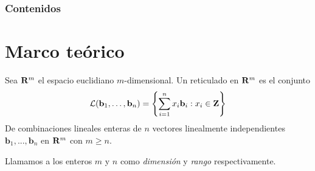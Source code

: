 


\frame{\titlepage}

\begin{frame}
\frametitle{Contenidos}
\tableofcontents
\end{frame}

\section{Marco teórico}


\begin{frame}
\begin{definition}[Reticulado]
Sea $\mathbf{R}^m$ el espacio euclidiano $m$-dimensional. Un reticulado en $\mathbf{R}^m$ es el conjunto
\[
\mathcal L(\mathbf{b}_1, \dots, \mathbf{b}_n) = \left\{\sum_{i = 1}^n x_i \mathbf{b}_i : x_i  \in \mathbf{Z}\right\}
\]
De combinaciones lineales enteras de $n$ vectores linealmente independientes $\mathbf{b}_1, ..., \mathbf{b}_n$ en $\mathbf{R}^m$ con $m \geq n$.
\end{definition}
Llamamos a los enteros $m$ y $n$ como {\it dimensión} y {\it rango} respectivamente.
\end{frame}

